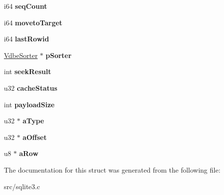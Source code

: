 \begin{DoxyCompactItemize}
\item 
\hypertarget{struct_vdbe_cursor_a4f11f0befb0dcf16273cc832ca6d92a5}{i64 {\bfseries seq\-Count}}\label{struct_vdbe_cursor_a4f11f0befb0dcf16273cc832ca6d92a5}

\item 
\hypertarget{struct_vdbe_cursor_af3c157d480c0597ba50aca227eb8e3b8}{i64 {\bfseries moveto\-Target}}\label{struct_vdbe_cursor_af3c157d480c0597ba50aca227eb8e3b8}

\item 
\hypertarget{struct_vdbe_cursor_af2ff971acc308c012c60b1e949c64411}{i64 {\bfseries last\-Rowid}}\label{struct_vdbe_cursor_af2ff971acc308c012c60b1e949c64411}

\item 
\hypertarget{struct_vdbe_cursor_a7e9030a9f4ff8f8161a78dae28a1fe3b}{\hyperlink{struct_vdbe_sorter}{Vdbe\-Sorter} $\ast$ {\bfseries p\-Sorter}}\label{struct_vdbe_cursor_a7e9030a9f4ff8f8161a78dae28a1fe3b}

\item 
\hypertarget{struct_vdbe_cursor_a5eff86e2a9c87dc15956ad362aa03f05}{int {\bfseries seek\-Result}}\label{struct_vdbe_cursor_a5eff86e2a9c87dc15956ad362aa03f05}

\item 
\hypertarget{struct_vdbe_cursor_acf243b5a94a6e5a11341d6fece473c00}{u32 {\bfseries cache\-Status}}\label{struct_vdbe_cursor_acf243b5a94a6e5a11341d6fece473c00}

\item 
\hypertarget{struct_vdbe_cursor_a5c1fa124d7f27a30e14ef0f455955cab}{int {\bfseries payload\-Size}}\label{struct_vdbe_cursor_a5c1fa124d7f27a30e14ef0f455955cab}

\item 
\hypertarget{struct_vdbe_cursor_a6992d2bf9eb8480985aec47dae58f1ab}{u32 $\ast$ {\bfseries a\-Type}}\label{struct_vdbe_cursor_a6992d2bf9eb8480985aec47dae58f1ab}

\item 
\hypertarget{struct_vdbe_cursor_a17431e67b341282aeb6c026cd01ec1e9}{u32 $\ast$ {\bfseries a\-Offset}}\label{struct_vdbe_cursor_a17431e67b341282aeb6c026cd01ec1e9}

\item 
\hypertarget{struct_vdbe_cursor_a6bd10979ffb5d4828967eea1d6e0d2c8}{u8 $\ast$ {\bfseries a\-Row}}\label{struct_vdbe_cursor_a6bd10979ffb5d4828967eea1d6e0d2c8}

\end{DoxyCompactItemize}


The documentation for this struct was generated from the following file\-:\begin{DoxyCompactItemize}
\item 
src/sqlite3.\-c\end{DoxyCompactItemize}
